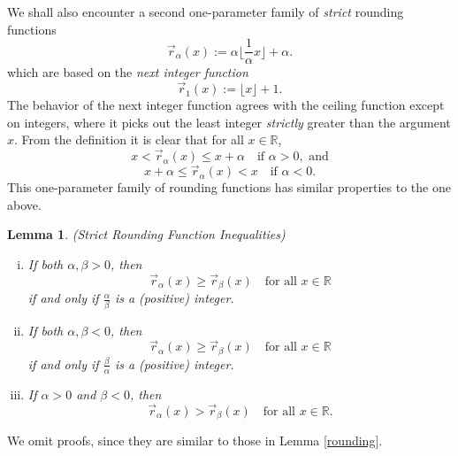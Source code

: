 \documentclass[12pt,letterpaper, reqno]{amsart}
\newtheorem{lem}[thm]{Lemma}
\theoremstyle{definition}
\theoremstyle{remark}
\newcommand{\RR}{\ensuremath{\mathbb{R}}}
\newcommand{\floor}[1]{\lfloor{#1}\rfloor}
\newcommand{\tround}{\vec{r}}
\begin{document}
We shall also encounter a second one-parameter family of {\em strict} rounding functions
\begin{equation}
\tround_\alpha(x) :=  \alpha\floor{\frac1\alpha x}+\alpha.
\end{equation}
which are based on the {\em next integer function}
$$
\tround_1(x) := \floor{x}+1.
$$
The behavior of the next integer function
agrees with  the ceiling function except on integers, where it picks out the least integer {\em strictly} greater than the argument $x$. 
From the definition it is clear that for all $x\in\RR$,
\[ x < \vec{r}_\alpha(x) \leq x+\alpha \quad\text{if }\alpha>0, \text{ and}\]
\[ x+\alpha\leq \vec{r}_\alpha(x) < x \quad\text{if }\alpha<0.\]
This one-parameter family of rounding  functions has similar properties to the one above. 


\begin{lem} \label{strict-rounding} {\em (Strict Rounding Function Inequalities)}

\begin{enumerate}[(i)]
\item[(i)]  If both $\alpha,\beta>0$, then
\[ \vec{r}_\alpha(x) \geq \vec{r}_\beta(x)  \quad\text{for all }x\in\RR\]
if and only if $\frac{\alpha}{\beta}$ is a (positive) integer.
\item[(ii)]  If both $\alpha,\beta<0$, then
\[  \vec{r}_\alpha(x) \geq \vec{r}_\beta(x) \quad\text{for all }x\in\RR\]
if and only if $\frac{\beta}{\alpha}$ is a (positive) integer.
\item[(iii)] If $\alpha>0$ and $\beta<0$, then
\[ \vec{r}_\alpha(x) > \vec{r}_\beta(x) \quad\text{for all }x\in\RR.\]
\end{enumerate}
\end{lem}
We omit proofs, since they are similar to those in Lemma \ref{rounding}.

% 
\end{document}
